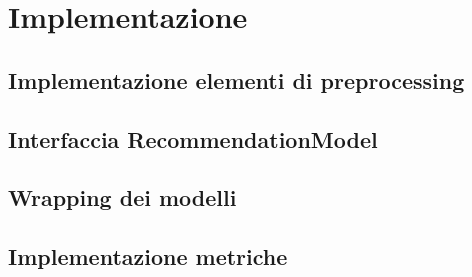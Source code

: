 \chapter{Implementazione}

\section{Implementazione elementi di preprocessing}

\section{Interfaccia RecommendationModel}

\section{Wrapping dei modelli}

\section{Implementazione metriche}
